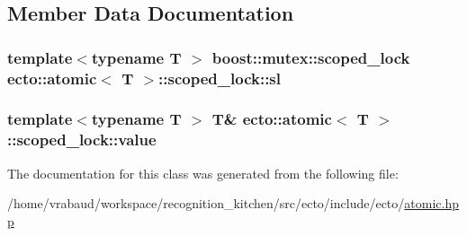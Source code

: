 \subsection{Member Data Documentation}
\hypertarget{classecto_1_1atomic_1_1scoped__lock_a637b9c7c8246e2ac352cb03fa9f4b229}{
\subsubsection[{sl}]{\setlength{\rightskip}{0pt plus 5cm}template$<$typename T $>$ boost\-::mutex\-::scoped\-\_\-lock {\bf ecto\-::atomic}$<$ T $>$\-::scoped\-\_\-lock\-::sl\hspace{0.3cm}{\ttfamily [private]}}}\label{classecto_1_1atomic_1_1scoped__lock_a637b9c7c8246e2ac352cb03fa9f4b229}
\hypertarget{classecto_1_1atomic_1_1scoped__lock_a89aa811b27815c91f99b3673a7f76753}{
\subsubsection[{value}]{\setlength{\rightskip}{0pt plus 5cm}template$<$typename T $>$ T\& {\bf ecto\-::atomic}$<$ T $>$\-::scoped\-\_\-lock\-::value}}\label{classecto_1_1atomic_1_1scoped__lock_a89aa811b27815c91f99b3673a7f76753}


The documentation for this class was generated from the following file\-:\begin{DoxyCompactItemize}
\item 
/home/vrabaud/workspace/recognition\-\_\-kitchen/src/ecto/include/ecto/\hyperlink{atomic_8hpp}{atomic.\-hpp}\end{DoxyCompactItemize}
